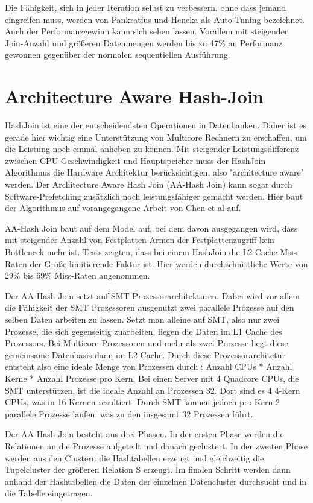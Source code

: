 Die Fähigkeit, sich in jeder Iteration selbst zu verbessern, ohne dass jemand eingreifen muss, werden von Pankratius und Heneka als Auto-Tuning bezeichnet. Auch der Performanzgewinn kann sich sehen lassen. Vorallem mit steigender Join-Anzahl und größeren Datenmengen werden bis zu 47\% an Performanz gewonnen gegenüber der normalen sequentiellen Ausführung.

\section{Architecture Aware Hash-Join}
\label{sec:AA-Hash-Join}

HashJoin ist eine der entscheidendsten Operationen in Datenbanken. Daher ist es gerade hier wichtig eine Unterstützung von Multicore Rechnern zu erschaffen, um die Leistung noch einmal anheben zu können. Mit steigender Leistungsdifferenz zwischen CPU-Geschwindigkeit und Hauptspeicher muss der HashJoin Algorithmus die Hardware Architektur berücksichtigen, also "architecture aware" werden. Der Architecture Aware Hash Join (AA-Hash Join) \cite{RASHID}\cite{GARCIA} kann sogar durch Software-Prefetching zusätzlich  noch leistungsfähiger gemacht werden. Hier baut der Algorithmus auf vorangegangene Arbeit von Chen et al \cite{CHEN} auf.

AA-Hash Join baut auf dem Model auf, bei dem davon ausgegangen wird, dass mit steigender Anzahl von Festplatten-Armen der Festplattenzugriff kein Bottleneck mehr ist. Tests zeigten, dass bei einem HashJoin die L2 Cache Miss Raten der Größe limitierende Faktor ist. Hier werden durchschnittliche Werte von 29\% bis 69\% Miss-Raten angenommen.

Der AA-Hash Join setzt auf SMT Prozessorarchitekturen. Dabei wird vor allem die Fähigkeit der SMT Prozessoren ausgenutzt zwei parallele Prozesse auf den selben Daten arbeiten zu lassen. Setzt man alleine auf SMT, also nur zwei Prozesse, die sich gegenseitig zuarbeiten, liegen die Daten im L1 Cache des Prozessors. Bei Multicore Prozessoren und mehr als zwei Prozesse liegt diese gemeinsame Datenbasis dann im L2 Cache. Durch diese Prozessorarchitetur entsteht also eine ideale Menge von Prozessen durch : Anzahl CPUs * Anzahl Kerne * Anzahl Prozesse pro Kern. Bei einen Server mit 4 Quadcore CPUs, die SMT unterstützen, ist die ideale Anzahl an Prozessen 32. Dort sind es 4 4-Kern CPUs, was in 16 Kernen resultiert. Durch SMT können jedoch pro Kern 2 parallele Prozesse laufen, was zu den insgesamt 32 Prozessen führt.

Der AA-Hash Join besteht aus drei Phasen. In der ersten Phase werden die Relationen an die Prozesse aufgeteilt und danach geclustert. In der zweiten Phase werden aus den Clustern die Hashtabellen erzeugt und gleichzeitig die Tupelcluster der größeren Relation S erzeugt. Im finalen Schritt werden dann anhand der Hashtabellen die Daten der einzelnen Datencluster durchsucht und in die Tabelle eingetragen.

